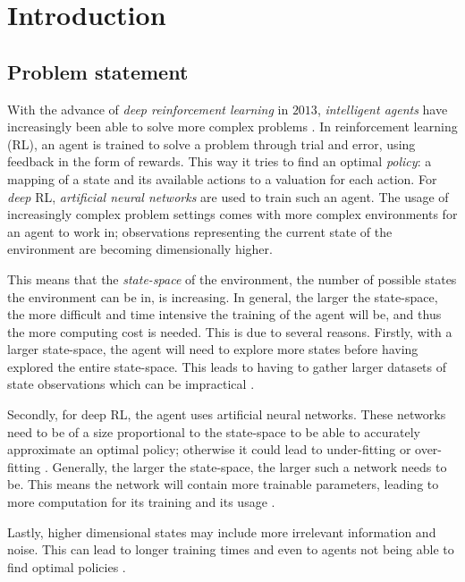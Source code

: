 \chapter{Introduction}\label{introduction}
\section{Problem statement}
With the advance of \emph{deep reinforcement learning} in $2013$, \emph{intelligent agents} have increasingly been able to solve more complex problems \cite{deeprl}. In reinforcement learning (RL), an agent is trained to solve a problem through trial and error, using feedback in the form of rewards. This way it tries to find an optimal \emph{policy}: a mapping of a state and its available actions to a valuation for each action. For \emph{deep} RL, \emph{artificial neural networks} are used to train such an agent. The usage of increasingly complex problem settings comes with more complex environments for an agent to work in; observations representing the current state of the environment are becoming dimensionally higher.
	
This means that the \emph{state-space} of the environment, the number of possible states the environment can be in, is increasing. In general, the larger the state-space, the more difficult and time intensive the training of the agent will be, and thus the more computing cost is needed. This is due to several reasons. Firstly, with a larger state-space, the agent will need to explore more states before having explored the entire state-space. This leads to having to gather larger datasets of state observations which can be impractical \cite{AE_2019}.

Secondly, for deep RL, the agent uses artificial neural networks. These networks need to be of a size proportional to the state-space to be able to accurately approximate an optimal policy; otherwise it could lead to under-fitting or over-fitting \cite{rlfitting}. Generally, the larger the state-space, the larger such a network needs to be. This means the network will contain more trainable parameters, leading to more computation for its training and its usage \cite{AE_2019}.

Lastly, higher dimensional states may include more irrelevant information and noise. This can lead to longer training times and even to agents not being able to find optimal policies \cite{AE_2016}.

